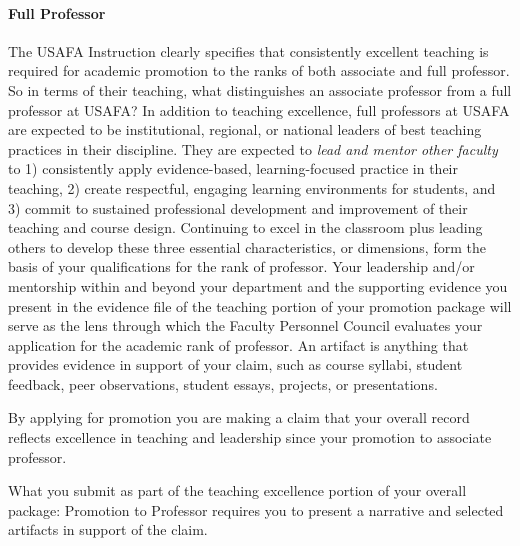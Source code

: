 \documentclass[11pt,titlepage]{article}
\begin{document}
\paragraph{Full Professor}
The USAFA Instruction clearly specifies that consistently excellent teaching is required for academic promotion to the ranks of both associate and full professor.
So in terms of their teaching, what distinguishes an associate professor from a full professor at USAFA?
In addition to teaching excellence, full professors at USAFA are expected to be institutional, regional, or national leaders of best teaching practices in their discipline.
They are expected to \emph{lead and mentor other faculty} to 1) consistently apply evidence-based, learning-focused practice in their teaching, 2) create respectful, engaging learning environments for students, and 3) commit to sustained professional development and improvement of their teaching and course design.
Continuing to excel in the classroom plus leading others to develop these three essential characteristics, or dimensions, form the basis of your qualifications for the rank of professor.
Your leadership and/or mentorship within and beyond your department and the supporting evidence you present in the evidence file of the teaching portion of your promotion package will serve as the lens through which the Faculty Personnel Council evaluates your application for the academic rank of professor.
An artifact is anything that
 provides evidence in support of your claim, such as course syllabi, student feedback, peer
 observations, student essays, projects, or presentations.

By applying for promotion you are making a claim that your overall record reflects excellence in teaching and leadership since your promotion to associate professor.

What you submit as part of the teaching excellence portion of your overall package: Promotion to Professor requires you to present a narrative and selected artifacts in support of the claim.
\end{document}
